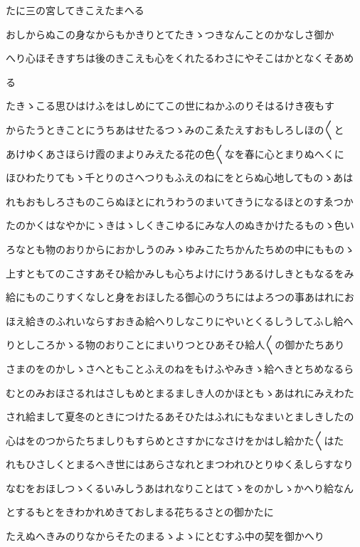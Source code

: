 \documentclass[a4paper,11pt,landscape]{ltjtarticle}
\begin{document}
たに三の宮してきこえたまへる
\par\medskip
おしからぬこの身なからもかきりとてたきゝつきなんことのかなしさ御か
\par\medskip
へり心ほそきすちは後のきこえも心をくれたるわさにやそこはかとなくそあめ
\par\medskip
る
\par\medskip
たきゝこる思ひはけふをはしめにてこの世にねかふのりそはるけき夜もす
\par\medskip
からたうときことにうちあはせたるつゝみのこゑたえすおもしろしほの〱と
\par\medskip
あけゆくあさほらけ霞のまよりみえたる花の色〱なを春に心とまりぬへくに
\par\medskip
ほひわたりてもゝ千とりのさへつりもふえのねにをとらぬ心地してものゝあは
\par\medskip
れもおもしろさものこらぬほとにれうわうのまいてきうになるほとのすゑつか
\par\medskip
たのかくはなやかにゝきはゝしくきこゆるにみな人のぬきかけたるものゝ色い
\par\medskip
ろなとも物のおりからにおかしうのみゝゆみこたちかんたちめの中にもものゝ
\par\medskip
上すともてのこさすあそひ給かみしも心ちよけにけうあるけしきともなるをみ
\par\medskip
給にものこりすくなしと身をおほしたる御心のうちにはよろつの事あはれにお
\par\medskip
ほえ給きのふれいならすおきゐ給へりしなこりにやいとくるしうしてふし給へ
\par\medskip
りとしころかゝる物のおりことにまいりつとひあそひ給人〱の御かたちあり
\par\medskip
さまのをのかしゝさへともことふえのねをもけふやみきゝ給へきとちめなるら
\par\medskip
むとのみおほさるれはさしもめとまるましき人のかほともゝあはれにみえわた
\par\medskip
され給まして夏冬のときにつけたるあそひたはふれにもなまいとましきしたの
\par\medskip
心はをのつからたちましりもすらめとさすかになさけをかはし給かた〱はた
\par\medskip
れもひさしくとまるへき世にはあらさなれとまつわれひとりゆくゑしらすなり
\par\medskip
なむをおほしつゝくるいみしうあはれなりことはてゝをのかしゝかへり給なん
\par\medskip
とするもとをきわかれめきておしまる花ちるさとの御かたに
\par\medskip
たえぬへきみのりなからそたのまるゝよゝにとむすふ中の契を御かへり
\end{document}
